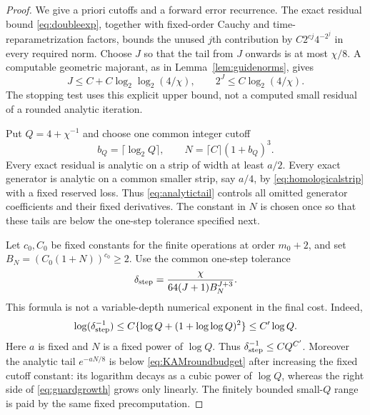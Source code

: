 \documentclass[11pt,a4paper]{amsart}
\theoremstyle{definition}
\theoremstyle{remark}
\numberwithin{equation}{section}
\begin{document}
\begin{proof}
We give a priori cutoffs and a forward error recurrence. The exact residual bound \eqref{eq:doubleexp}, together with fixed-order Cauchy and time-reparametrization factors, bounds the unused $j$th contribution by
$C2^{cj}4^{-2^j}$ in every required norm. Choose $J$ so that the tail from $J$ onwards is at most $\chi/8$. A computable geometric majorant, as in Lemma~\ref{lem:guidenorms}, gives
\begin{equation}\label{eq:stagecount}
 J\le C+C\log_2\log_2(4/\chi),\qquad
 2^J\le C\log_2(4/\chi).
\end{equation}
The stopping test uses this explicit upper bound, not a computed small residual of a rounded analytic iteration.

Put $Q=4+\chi^{-1}$ and choose one common integer cutoff
\[
 b_Q=\lceil\log_2Q\rceil,\qquad
 N=\lceil C\rceil(1+b_Q)^3.
\]
Every exact residual is analytic on a strip of width at least $a/2$. Every exact generator is analytic on a common smaller strip, say $a/4$, by \eqref{eq:homologicalstrip} with a fixed reserved loss. Thus \eqref{eq:analytictail} controls all omitted generator coefficients and their fixed derivatives. The constant in $N$ is chosen once so that these tails are below the one-step tolerance specified next.

Let $c_0,C_0$ be fixed constants for the finite operations at order $m_0+2$, and set $B_N=(C_0(1+N))^{c_0}\ge2$. Use the common one-step tolerance
\begin{equation}\label{eq:KAMroundbudget}
 \delta_{\rm step}=
 \frac{\chi}{64(J+1)B_N^{J+3}}.
\end{equation}
This formula is not a variable-depth numerical exponent in the final cost. Indeed,
\begin{equation}\label{eq:guardgrowth}
 \log(\delta_{\rm step}^{-1})
 \le C\{\log Q+(1+\log\log Q)^2\}\le C'\log Q.
\end{equation}
Here $a$ is fixed and $N$ is a fixed power of $\log Q$. Thus
$\delta_{\rm step}^{-1}\le C Q^{C'}$. Moreover the analytic tail $e^{-aN/8}$ is below \eqref{eq:KAMroundbudget} after increasing the fixed cutoff constant: its logarithm decays as a cubic power of $\log Q$, whereas the right side of \eqref{eq:guardgrowth} grows only linearly. The finitely bounded small-$Q$ range is paid by the same fixed precomputation.


\end{proof}
\end{document}
